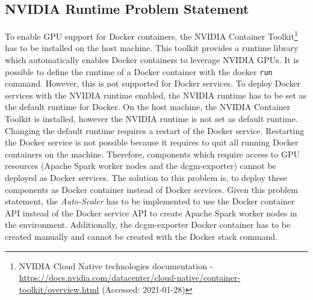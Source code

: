 \subsection{NVIDIA Runtime Problem Statement}
To enable GPU support for Docker containers, the NVIDIA Container Toolkit\footnote{NVIDIA Cloud Native technologies documentation - \url{https://docs.nvidia.com/datacenter/cloud-native/container-toolkit/overview.html} (Accessed: 2021-01-28)} has to be installed on the host machine. This toolkit provides a runtime library which automatically enables Docker containers to leverage NVIDIA GPUs.
It is possible to define the runtime of a Docker container with the docker \texttt{run} command. However, this is not supported for Docker services. To deploy Docker services with the NVIDIA runtime enabled, the NVIDIA runtime has to be set as the default runtime for Docker.
On the host machine, the NVIDIA Container Toolkit is installed, however the NVIDIA runtime is not set as default runtime.
Changing the default runtime requires a restart of the Docker service. Restarting the Docker service is not possible because it requires to quit all running Docker containers on the machine. Therefore, components which require access to GPU resources (Apache Spark worker nodes and the dcgm-exporter) cannot be deployed as Docker services.
The solution to this problem is, to deploy these components as Docker container instead of Docker services.
Given this problem statement, the \textit{Auto-Scaler} has to be implemented to use the Docker container API instead of the Docker service API to create Apache Spark worker nodes in the environment. Additionally, the dcgm-exporter Docker container has to be created manually and cannot be created with the Docker stack command.





